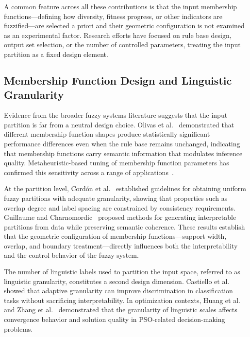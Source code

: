 A common feature across all these contributions is that the input membership functions---defining how diversity, fitness progress, or other indicators are fuzzified---are selected a priori and their geometric configuration is not examined as an experimental factor. Research efforts have focused on rule base design, output set selection, or the number of controlled parameters, treating the input partition as a fixed design element.

\subsection{Membership Function Design and Linguistic Granularity}
\label{subsec:rw_mf_design}

Evidence from the broader fuzzy systems literature suggests that the input partition is far from a neutral design choice. Olivas et al.~\cite{olivas2014comparative} demonstrated that different membership function shapes produce statistically significant performance differences even when the rule base remains unchanged, indicating that membership functions carry semantic information that modulates inference quality. Metaheuristic-based tuning of membership function parameters has confirmed this sensitivity across a range of applications~\cite{fierro2013optimization, nikolic2020bee}.

At the partition level, Cord\'on et al.~\cite{cordon2000uniform} established guidelines for obtaining uniform fuzzy partitions with adequate granularity, showing that properties such as overlap degree and label spacing are constrained by consistency requirements. Guillaume and Charnomordic~\cite{guillaume2004interpretable} proposed methods for generating interpretable partitions from data while preserving semantic coherence. These results establish that the geometric configuration of membership functions---support width, overlap, and boundary treatment---directly influences both the interpretability and the control behavior of the fuzzy system.

The number of linguistic labels used to partition the input space, referred to as linguistic granularity, constitutes a second design dimension. Castiello et al.~\cite{castiello2019interpretable} showed that adaptive granularity can improve discrimination in classification tasks without sacrificing interpretability. In optimization contexts, Huang et al.~\cite{huang2022linguistic} and Zhang et al.~\cite{zhang2022linguistic} demonstrated that the granularity of linguistic scales affects convergence behavior and solution quality in PSO-related decision-making problems.

